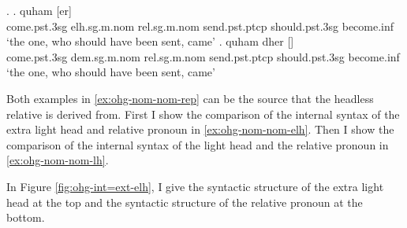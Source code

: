 \ex.\label{ex:ohg-nom-nom-rep}
\ag. quham [er]    \\
 come.\ac{pst}.3\ac{sg}\scsub{[nom]} \ac{elh}.\ac{sg}.\ac{m}.\ac{nom} \ac{rel}.\ac{sg}.\ac{m}.\ac{nom} send.\ac{pst}.\ac{ptcp}\scsub{[nom]} should.\ac{pst}.3\ac{sg} become.\ac{inf}\\
 `the one, who should have been sent, came' \label{ex:ohg-nom-nom-elh}
\bg. quham dher []   \\
 come.\ac{pst}.3\ac{sg}\scsub{[nom]} \ac{dem}.\ac{sg}.\ac{m}.\ac{nom} \ac{rel}.\ac{sg}.\ac{m}.\ac{nom} send.\ac{pst}.\ac{ptcp}\scsub{[nom]} should.\ac{pst}.3\ac{sg} become.\ac{inf}\\
 `the one, who should have been sent, came' \label{ex:ohg-nom-nom-lh}

Both examples in \ref{ex:ohg-nom-nom-rep} can be the source that the headless relative is derived from. First I show the comparison of the internal syntax of the extra light head and relative pronoun in \ref{ex:ohg-nom-nom-elh}. Then I show the comparison of the internal syntax of the light head and the relative pronoun in \ref{ex:ohg-nom-nom-lh}.

In Figure \ref{fig:ohg-int=ext-elh}, I give the syntactic structure of the extra light head at the top and the syntactic structure of the relative pronoun at the bottom.

